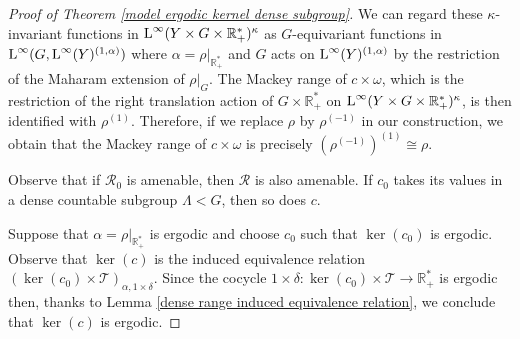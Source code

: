 \documentclass[a4paper,11pt]{amsart}
\numberwithin{equation}{section}
\theoremstyle{definition}
\newcommand{\R}{\mathbb{R}}
\newcommand{\cT}{\mathcal{T}}
\newcommand{\rL}{\mathord{\text{\rm L}}}
\newcommand{\cR}{\mathcal{R}}
\begin{document}
\begin{proof}[Proof of Theorem \ref{model ergodic kernel dense subgroup}]
     We can regard these $\kappa$-invariant functions in $\rL^\infty(Y \times G \times \R^*_+)^{\kappa}$ as $G$-equivariant functions in $\rL^\infty(G, \rL^\infty(Y)^{(1,\alpha)})$ where $\alpha=\rho|_{\R^*_+}$ and $G$ acts on $\rL^\infty(Y)^{(1,\alpha)}$ by the restriction of the Maharam extension of $\rho|_G$. The Mackey range of $c \times \omega$, which is the restriction of the right translation action of $G \times \R^*_+$ on $\rL^\infty(Y \times G \times \R^*_+)^{\kappa}$, is then identified with $\rho^{(1)}$. Therefore, if we replace $\rho$ by $\rho^{(-1)}$ in our construction, we obtain that the Mackey range of $c \times \omega$ is precisely $(\rho^{(-1)})^{(1)} \cong \rho$.

    Observe that if  $\cR_0$ is amenable, then $\cR$ is also amenable. If $c_0$ takes its values in a dense countable subgroup $\Lambda < G$, then so does $c$. 

    Suppose that $\alpha=\rho|_{\R^*_+}$ is ergodic and choose $c_0$ such that $\ker(c_0)$ is ergodic. Observe that $\ker(c)$ is the induced equivalence relation $(\ker(c_0) \times \cT)_{\alpha,1 \times \delta}$.
     Since the cocycle $1 \times \delta  : \ker(c_0) \times \cT \rightarrow \R^*_+$ is ergodic then, thanks to Lemma \ref{dense range induced equivalence relation}, we conclude that $\ker(c)$ is ergodic.
\end{proof}
\end{document}
